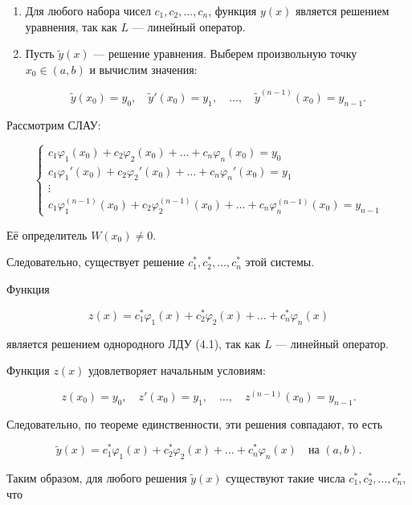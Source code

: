 {	\begin{enumerate}
	\item Для любого набора чисел \( c_1, c_2, \ldots, c_n \), функция \( y(x) \) является решением уравнения, так как \( L \) — линейный оператор.

	\item Пусть \( \tilde{y}(x) \) — решение уравнения. Выберем произвольную точку \( x_0 \in (a, b) \) и вычислим значения:
	

	\[
	\tilde{y}(x_0) = y_0, \quad \tilde{y}'(x_0) = y_1, \quad \ldots, \quad \tilde{y}^{(n-1)}(x_0) = y_{n-1}.
	\]


	\end{enumerate}

	Рассмотрим СЛАУ:



	\[
	\begin{cases}
	c_1 \varphi_1(x_0) + c_2 \varphi_2(x_0) + \ldots + c_n \varphi_n(x_0) = y_0 \\
	c_1 \varphi_1'(x_0) + c_2 \varphi_2'(x_0) + \ldots + c_n \varphi_n'(x_0) = y_1 \\
	\vdots \\
	c_1 \varphi_1^{(n-1)}(x_0) + c_2 \varphi_2^{(n-1)}(x_0) + \ldots + c_n \varphi_n^{(n-1)}(x_0) = y_{n-1}
	\end{cases}
	\]



	Её определитель \( W(x_0) \neq 0 \).

	Следовательно, существует решение \( c_1^*, c_2^*, \ldots, c_n^* \) этой системы.

	Функция


	\[
	z(x) = c^*_1 \varphi_1(x) + c^*_2 \varphi_2(x) + \ldots + c^*_n \varphi_n(x)
	\]


	является решением однородного ЛДУ (4.1), так как \( L \) — линейный оператор.

	Функция \( z(x) \) удовлетворяет начальным условиям:


	\[
	z(x_0) = y_0, \quad z'(x_0) = y_1, \quad \ldots, \quad z^{(n-1)}(x_0) = y_{n-1}.
	\]



	Следовательно, по теореме единственности, эти решения совпадают, то есть


	\[
	\widetilde{y}(x) = c^*_1 \varphi_1(x) + c^*_2 \varphi_2(x) + \ldots + c^*_n \varphi_n(x) \quad \text{на } (a, b).
	\]



	Таким образом, для любого решения \( \widetilde{y}(x) \) существуют такие числа \( c^*_1, c^*_2, \ldots, c^*_n \), что


}
